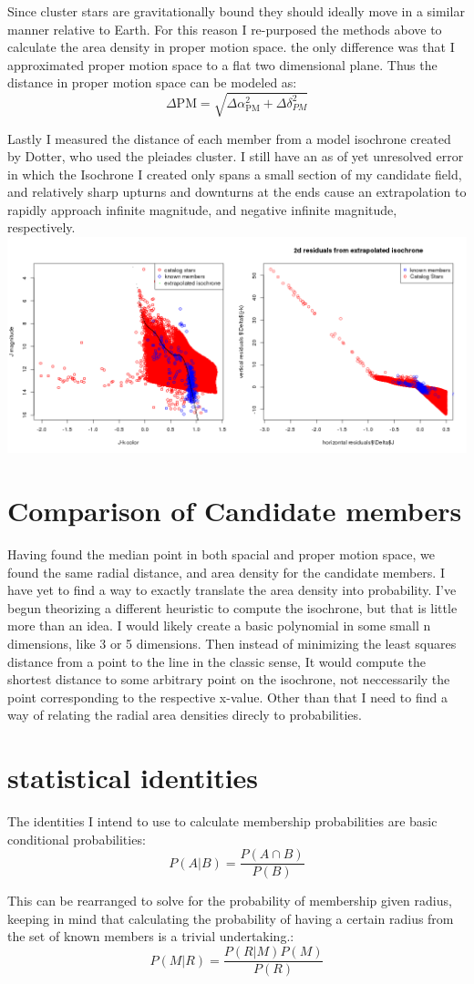 \documentclass{article}
\begin{document}
\begin{multicols}{2}
Since cluster stars are gravitationally bound they should ideally move in a similar manner relative to Earth.  For this reason I re-purposed the methods above to calculate the area density in proper motion space. the only difference was that I approximated proper motion space to a flat two dimensional plane.  Thus the distance in proper motion space can be modeled as:
\begin{equation}
    \Delta\mathrm{PM}=\sqrt{\Delta\alpha_{\mathrm{PM}}^2+\Delta\delta_{PM}^2}
\end{equation}

Lastly I measured the distance of each member from a model isochrone created by Dotter, who used the pleiades cluster.  I still have an as of yet unresolved error in which the Isochrone I created only spans a small section of my candidate field, and relatively sharp upturns and downturns at the ends cause an extrapolation to rapidly approach infinite magnitude, and negative infinite magnitude, respectively.
\includegraphics[width=.5\textwidth]{isochroneB}
\section{Comparison of Candidate members}

Having found the median point in both spacial and proper motion space, we found the same radial distance, and area density for the candidate members.  I have yet to find a way to exactly translate the area density into probability.  I've begun theorizing a different heuristic to compute the isochrone, but that is little more than an idea.  I would likely create a basic polynomial in some small n dimensions, like 3 or 5 dimensions.  Then instead of minimizing the least squares distance from a point to the line in the classic sense, It would compute the shortest distance to some arbitrary point on the isochrone, not neccessarily the point corresponding to the respective x-value. Other than that I need to find a way of relating the radial area densities direcly to probabilities.   

\section{statistical identities}
The identities I intend to use to calculate membership probabilities are basic conditional probabilities:
\begin{equation}
P(A|B)=\frac{P(A\cap B)}{P(B)}
\end{equation}

This can be rearranged to solve for the probability of membership given radius, keeping in mind that calculating the probability of having a certain radius from the set of known members is a trivial undertaking.:
\begin{equation}
P(M|R)=\frac{P(R|M)P(M)}{P(R)}
\end{equation}
\end{multicols}
\end{document}

